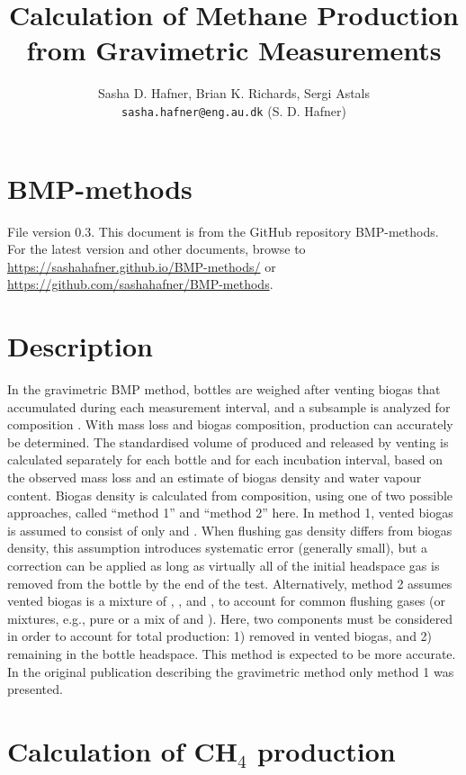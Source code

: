 \documentclass[]{article}
\title {Calculation of Methane Production from Gravimetric Measurements}
\author{Sasha D. Hafner, Brian K. Richards, Sergi Astals
\\
\texttt{sasha.hafner@eng.au.dk} (S. D. Hafner)\\
}
\begin{document}
\maketitle

\section{BMP-methods}
File version 0.3. 
This document is from the GitHub repository BMP-methods.
For the latest version and other documents, browse to \url{https://sashahafner.github.io/BMP-methods/} or \url{https://github.com/sashahafner/BMP-methods}.

\section{Description}
In the gravimetric BMP method, bottles are weighed after venting biogas that accumulated during each measurement interval, and a subsample is analyzed for composition \cite{validation}.
With mass loss and biogas composition,  production can accurately be determined.
The standardised volume of  produced and released by venting is calculated separately for each bottle and for each incubation interval, based on the observed mass loss and an estimate of biogas density and water vapour content. 
Biogas density is calculated from composition, using one of two possible approaches, called ``method 1'' and ``method 2'' here.
In method 1, vented biogas is assumed to consist of only  and . 
When flushing gas density differs from biogas density, this assumption introduces systematic error (generally small), but a correction can be applied as long as virtually all of the initial headspace gas is removed from the bottle by the end of the test. 
Alternatively, method 2 assumes vented biogas is a mixture of , , and , to account for common flushing gases (or mixtures, e.g., pure  or a mix of  and ).
Here, two components must be considered in order to account for total  production: 1)  removed in vented biogas, and 2)  remaining in the bottle headspace.
This method is expected to be more accurate.
In the original publication describing the gravimetric method \cite{validation} only method 1 was presented.

\section{Calculation of CH$_4$ production}
\end{document}
